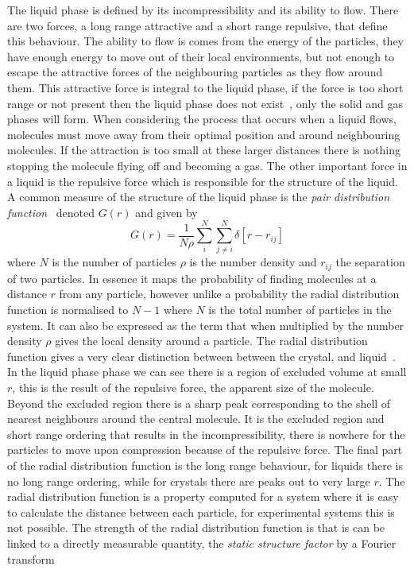The liquid phase is defined by its incompressibility and its ability to flow. There are two forces, a long range attractive and a short range repulsive, that define this behaviour. The ability to flow is comes from the energy of the particles, they have enough energy to move out of their local environments, but not enough to escape the attractive forces of the neighbouring particles as they flow around them. This attractive force is integral to the liquid phase, if the force is too short range or not present then the liquid phase does not exist~\cite{tejero:94}, only the solid and gas phases will form. When considering the process that occurs when a liquid flows, molecules must move away from their optimal position and around neighbouring molecules. If the attraction is too small at these larger distances there is nothing stopping the molecule flying off and becoming a gas. The other important force in a liquid is the repulsive force which is responsible for the structure of the liquid. A common measure of the structure of the liquid phase is the \emph{pair distribution function}~ denoted $G(r)$ and given by
\begin{equation}
    G(r) = \frac{1}{N\rho} \sum_i^N \sum_{j\ne i}^N \delta[ r - r_{ij}]
\end{equation}
where $N$ is the number of particles $\rho$ is the number density and $r_{ij}$ the separation of two particles. In essence it maps the probability of finding molecules at a distance $r$ from any particle, however unlike a probability the radial distribution function is normalised to $N-1$ where $N$ is the total number of particles in the system. It can also be expressed as the term that when multiplied by the number density $\rho$ gives the local density around a particle. The radial distribution function gives a very clear distinction between between the crystal, and liquid~. In the liquid phase phase we can see there is a region of excluded volume at small $r$, this is the result of the repulsive force, the apparent size of the molecule. Beyond the excluded region there is a sharp peak corresponding to the shell of nearest neighbours around the central molecule. It is the excluded region and short range ordering that results in the incompressibility, there is nowhere for the particles to move upon compression because of the repulsive force. The final part of the radial distribution function is the long range behaviour, for liquids there is no long range ordering, while for crystals there are peaks out to very large $r$. The radial distribution function is a property computed for a system where it is easy to calculate the distance between each particle, for experimental systems this is not possible. The strength of the radial distribution function is that is can be linked to a directly measurable quantity, the \emph{static structure factor} by a Fourier transform
